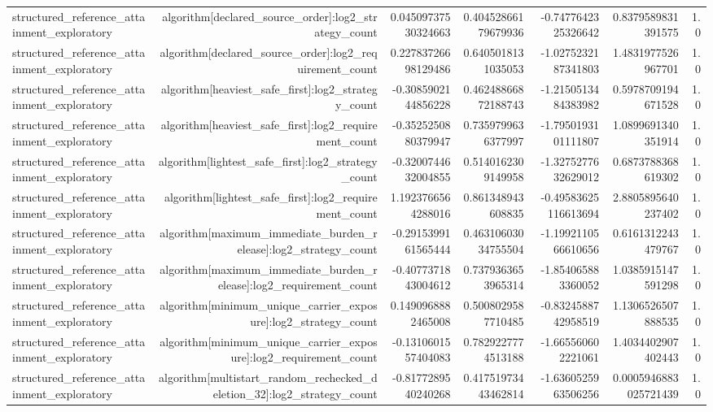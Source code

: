 {\begin{longtable}{lrrrrrr}
structured\_reference\_attainment\_exploratory & algorithm[declared\_source\_order]:log2\_strategy\_count & 0.04509737530324663 & 0.40452866179679936 & -0.7477642325326642 & 0.8379589831391575 & 1.0 \\
structured\_reference\_attainment\_exploratory & algorithm[declared\_source\_order]:log2\_requirement\_count & 0.22783726698129486 & 0.6405018131035053 & -1.0275232187341803 & 1.4831977526967701 & 1.0 \\
structured\_reference\_attainment\_exploratory & algorithm[heaviest\_safe\_first]:log2\_strategy\_count & -0.3085902144856228 & 0.46248866872188743 & -1.2150513484383982 & 0.5978709194671528 & 1.0 \\
structured\_reference\_attainment\_exploratory & algorithm[heaviest\_safe\_first]:log2\_requirement\_count & -0.3525250880379947 & 0.7359799636377997 & -1.7950193101111807 & 1.0899691340351914 & 1.0 \\
structured\_reference\_attainment\_exploratory & algorithm[lightest\_safe\_first]:log2\_strategy\_count & -0.3200744632004855 & 0.5140162309149958 & -1.3275277632629012 & 0.6873788368619302 & 1.0 \\
structured\_reference\_attainment\_exploratory & algorithm[lightest\_safe\_first]:log2\_requirement\_count & 1.1923766564288016 & 0.861348943608835 & -0.49583625116613694 & 2.8805895640237402 & 1.0 \\
structured\_reference\_attainment\_exploratory & algorithm[maximum\_immediate\_burden\_release]:log2\_strategy\_count & -0.2915399161565444 & 0.46310603034755504 & -1.1992110566610656 & 0.6161312243479767 & 1.0 \\
structured\_reference\_attainment\_exploratory & algorithm[maximum\_immediate\_burden\_release]:log2\_requirement\_count & -0.4077371843004612 & 0.7379363653965314 & -1.854065883360052 & 1.0385915147591298 & 1.0 \\
structured\_reference\_attainment\_exploratory & algorithm[minimum\_unique\_carrier\_exposure]:log2\_strategy\_count & 0.1490968882465008 & 0.5008029587710485 & -0.8324588742958519 & 1.1306526507888535 & 1.0 \\
structured\_reference\_attainment\_exploratory & algorithm[minimum\_unique\_carrier\_exposure]:log2\_requirement\_count & -0.1310601557404083 & 0.7829227774513188 & -1.665560602221061 & 1.4034402907402443 & 1.0 \\
structured\_reference\_attainment\_exploratory & algorithm[multistart\_random\_rechecked\_deletion\_32]:log2\_strategy\_count & -0.8177289540240268 & 0.41751973443462814 & -1.6360525963506256 & 0.0005946883025721439 & 1.0 \\

\end{longtable}}
